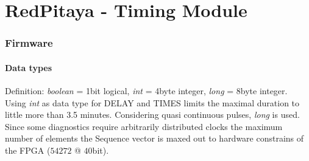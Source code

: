 \documentclass{article}
\begin{document}
\thispagestyle{empty}
\part*{\center RedPitaya - Timing Module}
\section*{Firmware}
\subsection*{Data types}
Definition: \textit{boolean} = 1bit logical, \textit{int} = 4byte integer, \textit{long} = 8byte integer.\\
Using \textit{int} as data type for DELAY and TIMES limits the maximal duration to little more than 3.5 minutes. Considering quasi continuous pulses, \textit{long} is used.
Since some diagnostics require arbitrarily distributed clocks the maximum number of elements the Sequence vector is maxed out to hardware constrains of the FPGA ($54272$ @ $40$bit).
\end{document}
